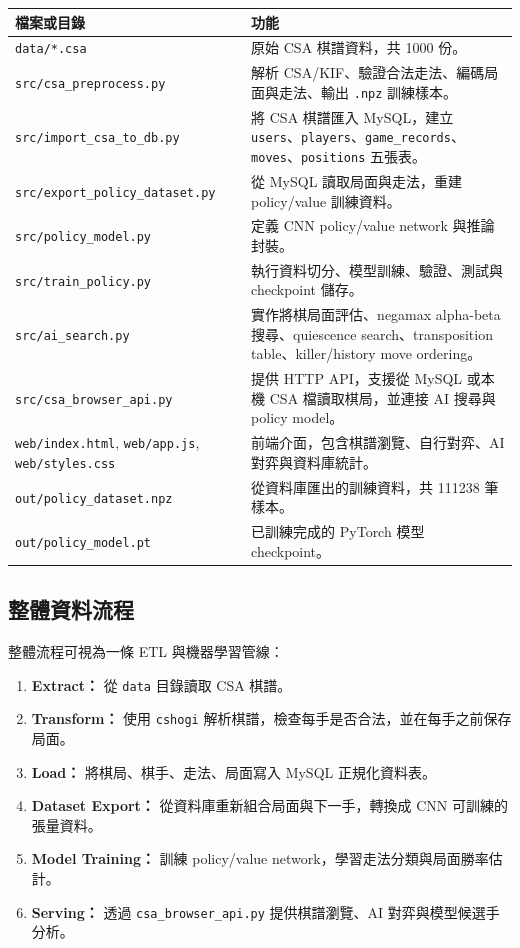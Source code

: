 \documentclass[12pt,a4paper,fontset=none]{ctexart}
\begin{document}
\begin{longtable}{p{}p{}}
\toprule
\textbf{檔案或目錄} & \textbf{功能}\\
\midrule
\endhead
\texttt{data/*.csa} & 原始 CSA 棋譜資料，共 1000 份。\\
\texttt{src/csa\_preprocess.py} & 解析 CSA/KIF、驗證合法走法、編碼局面與走法、輸出 \texttt{.npz} 訓練樣本。\\
\texttt{src/import\_csa\_to\_db.py} & 將 CSA 棋譜匯入 MySQL，建立 \texttt{users}、\texttt{players}、\texttt{game\_records}、\texttt{moves}、\texttt{positions} 五張表。\\
\texttt{src/export\_policy\_dataset.py} & 從 MySQL 讀取局面與走法，重建 policy/value 訓練資料。\\
\texttt{src/policy\_model.py} & 定義 CNN policy/value network 與推論封裝。\\
\texttt{src/train\_policy.py} & 執行資料切分、模型訓練、驗證、測試與 checkpoint 儲存。\\
\texttt{src/ai\_search.py} & 實作將棋局面評估、negamax alpha-beta 搜尋、quiescence search、transposition table、killer/history move ordering。\\
\texttt{src/csa\_browser\_api.py} & 提供 HTTP API，支援從 MySQL 或本機 CSA 檔讀取棋局，並連接 AI 搜尋與 policy model。\\
\texttt{web/index.html}, \texttt{web/app.js}, \texttt{web/styles.css} & 前端介面，包含棋譜瀏覽、自行對弈、AI 對弈與資料庫統計。\\
\texttt{out/policy\_dataset.npz} & 從資料庫匯出的訓練資料，共 111238 筆樣本。\\
\texttt{out/policy\_model.pt} & 已訓練完成的 PyTorch 模型 checkpoint。\\
\bottomrule
\end{longtable}

\subsection{整體資料流程}
整體流程可視為一條 ETL 與機器學習管線：

\begin{enumerate}
  \item \textbf{Extract：} 從 \texttt{data} 目錄讀取 CSA 棋譜。
  \item \textbf{Transform：} 使用 \texttt{cshogi} 解析棋譜，檢查每手是否合法，並在每手之前保存局面。
  \item \textbf{Load：} 將棋局、棋手、走法、局面寫入 MySQL 正規化資料表。
  \item \textbf{Dataset Export：} 從資料庫重新組合局面與下一手，轉換成 CNN 可訓練的張量資料。
  \item \textbf{Model Training：} 訓練 policy/value network，學習走法分類與局面勝率估計。
  \item \textbf{Serving：} 透過 \texttt{csa\_browser\_api.py} 提供棋譜瀏覽、AI 對弈與模型候選手分析。
\end{enumerate}
\end{document}
